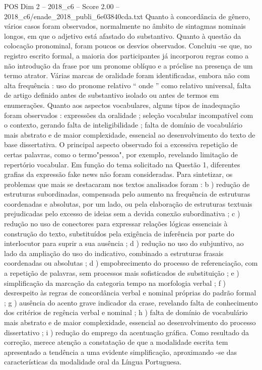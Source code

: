 \begin{textsample}{POS Dim 2 – 2018\_c6 – Score 2.00 – 2018\_c6/enade\_2018\_publi\_6e03840cda.txt}
Quanto à concordância de gênero, vários casos foram observados, normalmente no âmbito de sintagmas nominais longos, em que o adjetivo está afastado do substantivo.
Quanto à questão da colocação pronominal, foram poucos os desvios observados.
Concluiu -se que, no registro escrito formal, a maioria dos participantes já incorporou regras como a não introdução da frase por um pronome oblíquo e a próclise na presença de um termo atrator.
Várias marcas de oralidade foram identificadas, embora não com alta frequência : uso do pronome relativo “ onde ” como relativo universal, falta de artigo definido antes de substantivo isolado ou antes de termos em enumerações.
Quanto aos aspectos vocabulares, alguns tipos de inadequação foram observados : expressões da oralidade ; seleção vocabular incompatível com o contexto, gerando falta de inteligibilidade ; falta de domínio de vocabulário mais abstrato e de maior complexidade, essencial ao desenvolvimento do texto de base dissertativa.
O principal aspecto observado foi a excessiva repetição de certas palavras, como o termo"pessoa", por exemplo, revelando limitação de repertório vocabular.
Em função do tema solicitado na Questão 1, diferentes grafias da expressão fake news não foram consideradas.
Para sintetizar, os problemas que mais se destacaram nos textos analisados foram : b ) redução de estruturas subordinadas, compensada pelo aumento na frequência de estruturas coordenadas e absolutas, por um lado, ou pela elaboração de estruturas textuais prejudicadas pelo excesso de ideias sem a devida conexão subordinativa ; c ) redução no uso de conectores para expressar relações lógicas essenciais à construção do texto, substituídos pela exigência de inferência por parte do interlocutor para suprir a sua ausência ; d ) redução no uso do subjuntivo, ao lado da ampliação do uso do indicativo, combinado a estruturas frasais coordenadas ou absolutas ; d ) empobrecimento do processo de referenciação, com a repetição de palavras, sem processos mais sofisticados de substituição ; e ) simplificação da marcação da categoria tempo na morfologia verbal ; f ) desrespeito às regras de concordância verbal e nominal próprias do padrão formal ; g ) ausência do acento grave indicador da crase, revelando falta de conhecimento dos critérios de regência verbal e nominal ; h ) falta de domínio de vocabulário mais abstrato e de maior complexidade, essencial ao desenvolvimento do processo dissertativo ; i ) redução do emprego da acentuação gráfica.
Como resultado da correção, merece atenção a constatação de que a modalidade escrita tem apresentado a tendência a uma evidente simplificação, aproximando -se das características da modalidade oral da Língua Portuguesa.

\end{textsample}
